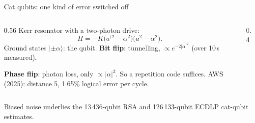 \documentclass[aspectratio=169,11pt]{beamer}
\newcommand{\ket}[1]{|#1\rangle}
\begin{document}
\begin{frame}{Cat qubits: one kind of error switched off}
  \begin{columns}[c]
    \begin{column}{0.56\textwidth}
      Kerr resonator with a two-photon drive:
      \[ H=-K\big(a^{\dagger2}-\alpha^2\big)\big(a^2-\alpha^2\big). \]
      Ground states $\ket{\pm\alpha}$: the qubit.
      \vskip1mm
      \textbf{Bit flip}: tunnelling, $\propto e^{-2|\alpha|^2}$ (over 10\,s measured).\par
      \textbf{Phase flip}: photon loss, only $\propto|\alpha|^2$.
      \vskip1mm
      So a repetition code suffices. AWS (2025): distance 5, 1.65\% logical error per cycle.
    \end{column}
    \begin{column}{0.4\textwidth}
      \centering
    \end{column}
  \end{columns}
  \begin{takeaway}Biased noise underlies the 13\,436-qubit RSA and 126\,133-qubit ECDLP cat-qubit estimates.\end{takeaway}
\end{frame}
\end{document}
